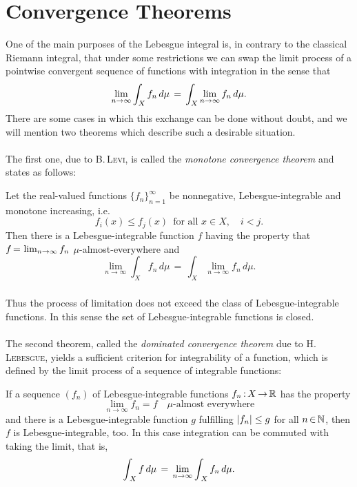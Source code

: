 \documentclass[11pt,twoside]{article}
\begin{document}
\section{Convergence Theorems}
One of the main purposes of the Lebesgue integral is,
in contrary to the classical Riemann integral,
that under some restrictions
we can swap the limit process of a pointwise convergent sequence
of functions with integration in the sense that
\[
\lim_{n \to \infty} \int_{X} f_n \, d \mu
\=
\int_{X} \lim_{n \to \infty} f_n \, d \mu.
\]
There are some cases in which this exchange can be done without doubt,
and we will mention two theorems which describe such a desirable situation.

\paragraph{}
The first one,
due to \textsc{B.\,Levi},
is called the \textit{monotone convergence theorem} and states as follows:

\begin{theorem}\label{MONOTON_CONVERGENCE_THEOREM}
Let the real-valued functions $\{f_n\}_{n=1}^{\infty}$ be nonnegative,
Lebesgue-integrable and monotone increasing, i.e.
\[
f_i(x) \leq f_j(x) \, \mbox{ for all } x \in X, \quad i < j.
\]
Then there is a Lebesgue-integrable function $f$ having the property
that $f \eq \lim_{n \to \infty} f_n$ $\mu$-almost-everywhere and
\[
\lim_{n \to \infty} \int_{X} f_n \, d \mu \,
= \,
\int_{X} \lim_{n \to \infty} f_n \, d \mu.
\]
\end{theorem}

\subparagraph{}
Thus the process of limitation does not exceed
the class of Lebesgue-integrable functions.
In this sense the set of Lebesgue-integrable functions is closed.

\paragraph{}
The second theorem,
called the \textit{dominated convergence theorem} due to \textsc{H.\,Lebesgue},
yields a sufficient criterion for integrability of a function,
which is defined by the limit process of a sequence of integrable functions:

\begin{theorem}\label{DOMINATED_CONVERGENCE_THEOREM}
If a sequence $(f_n)$ of Lebesgue-integrable functions
$f_n \: X \xto \R$ has the property
\[
\lim_{n \to \infty} f_n = f \quad \mu \mbox{-almost everywhere}
\]
and there is a Lebesgue-integrable function $g$
fulfilling $\abs{f_n} \leq g$ for all $n \xeof \N$,
then $f$ is Lebesgue-integrable,
too.
In this case integration can be commuted with taking the limit,
that is,
\[
\int_{\,X} f \, d \mu
\=
\lim_{n \to \infty} \int_{\,X} f_n \, d \mu.
\]
\end{theorem}
\end{document}

